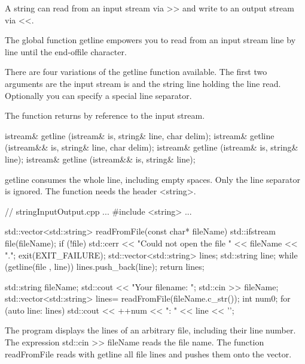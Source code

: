 A string can read from an input stream via >> and write to an output stream via <{}<.

The global function getline empowers you to read from an input stream line by line until the end-offile character.

There are four variations of the getline function available. The first two arguments are the input stream is and the string line holding the line read. Optionally you can specify a special line separator.

The function returns by reference to the input stream.

\begin{cpp}
istream& getline (istream& is, string& line, char delim);
istream& getline (istream&& is, string& line, char delim);
istream& getline (istream& is, string& line);
istream& getline (istream&& is, string& line);
\end{cpp}

getline consumes the whole line, including empty spaces. Only the line separator is ignored. The function needs the header <string>.


\begin{cpp}
// stringInputOutput.cpp
...
#include <string>
...

std::vector<std::string> readFromFile(const char* fileName){
	std::ifstream file(fileName);
	if (!file){
		std::cerr << "Could not open the file " << fileName << ".";
		exit(EXIT_FAILURE);
	}
	std::vector<std::string> lines;
	std::string line;
	while (getline(file , line)) lines.push_back(line);
	return lines;
}

std::string fileName;
std::cout << "Your filename: ";
std::cin >> fileName;
std::vector<std::string> lines= readFromFile(fileName.c_str());
int num{0};
for (auto line: lines) std::cout << ++num << ": " << line << '\n';
\end{cpp}

The program displays the lines of an arbitrary file, including their line number. The expression std::cin >{}> fileName reads the file name. The function readFromFile reads with getline all file lines and pushes them onto the vector.


































